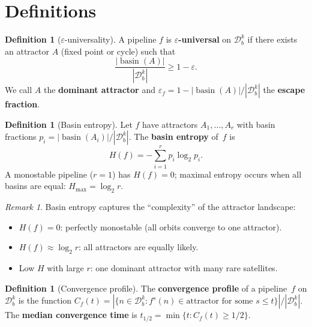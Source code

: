 \documentclass[11pt,a4paper]{amsart}
\theoremstyle{plain}
\theoremstyle{definition}
\newtheorem{definition}[theorem]{Definition}
\theoremstyle{remark}
\newtheorem{remark}[theorem]{Remark}
\DeclareMathOperator{\basin}{basin}
\begin{document}
\section{Definitions}\label{sec:definitions}

\begin{definition}[$\varepsilon$-universality]\label{def:eps-univ}
A pipeline $f$ is \textbf{$\varepsilon$-universal} on $\mathcal{D}_b^k$ if
there exists an attractor $A$ (fixed point or cycle) such that
\[
\frac{|\basin(A)|}{|\mathcal{D}_b^k|} \geq 1 - \varepsilon.
\]
We call $A$ the \textbf{dominant attractor} and
$\varepsilon_f = 1 - |\basin(A)|/|\mathcal{D}_b^k|$ the
\textbf{escape fraction}.
\end{definition}

\begin{definition}[Basin entropy]\label{def:basin-entropy}
Let $f$ have attractors $A_1, \ldots, A_r$ with basin fractions
$p_i = |\basin(A_i)|/|\mathcal{D}_b^k|$. The \textbf{basin entropy} of~$f$ is
\[
H(f) = -\sum_{i=1}^{r} p_i \log_2 p_i.
\]
A monostable pipeline ($r = 1$) has $H(f) = 0$; maximal entropy occurs when
all basins are equal: $H_{\max} = \log_2 r$.
\end{definition}

\begin{remark}
Basin entropy captures the ``complexity'' of the attractor landscape:
\begin{itemize}
\item $H(f) = 0$: perfectly monostable (all orbits converge to one attractor).
\item $H(f) \approx \log_2 r$: all attractors are equally likely.
\item Low $H$ with large $r$: one dominant attractor with many rare satellites.
\end{itemize}
\end{remark}

\begin{definition}[Convergence profile]\label{def:conv-profile}
The \textbf{convergence profile} of a pipeline~$f$ on $\mathcal{D}_b^k$ is
the function $C_f(t) = |\{n \in \mathcal{D}_b^k : f^s(n) \in
\text{attractor for some } s \leq t\}| / |\mathcal{D}_b^k|$.
The \textbf{median convergence time} is $t_{1/2} = \min\{t : C_f(t) \geq 1/2\}$.
\end{definition}

\end{document}
